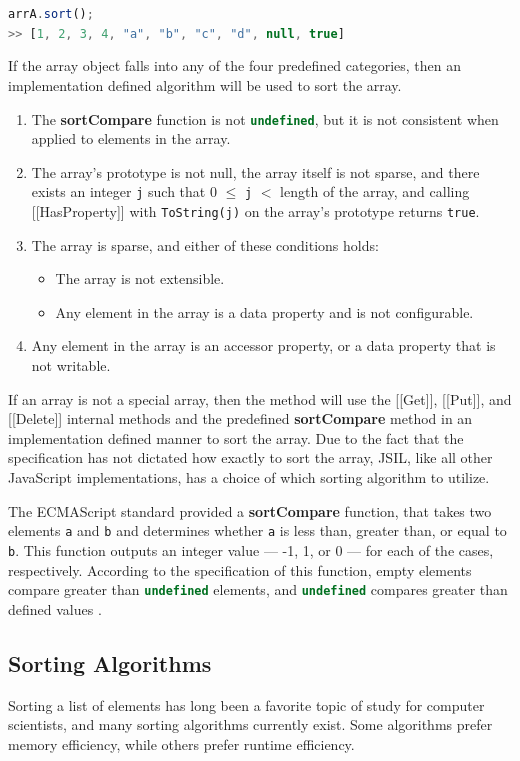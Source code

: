 \documentclass[a4paper,11pt,twoside]{report}
\def\jsinline{\lstinline[language=JavaScript, basicstyle=\small]}%\end{lstlisting}
\begin{document}
\jsinline|arrA.sort();|\\
\jsinline|>> [1, 2, 3, 4, "a", "b", "c", "d", null, true] |

If the array object falls into any of the four predefined categories, then an implementation defined algorithm will be used to sort the array. 

\begin{enumerate}
\item The \textbf{sortCompare} function is not \jsinline|undefined|, but it is not consistent when applied to elements in the array.
\item The array's prototype is not null, the array itself is not sparse, and there exists an integer \texttt{j} such that 0 $\leq$ \texttt{j} $<$ length of the array, and calling [[HasProperty]] with \texttt{ToString(j)} on the array's prototype returns \texttt{true}.
\item The array is sparse, and either of these conditions holds:
\begin{itemize}
\item The array is not extensible.
\item Any element in the array is a data property and is not configurable.
\end{itemize}
\item Any element in the array is an accessor property, or a data property that is not writable.
\end{enumerate}

If an array is not a special array, then the method will use the [[Get]], [[Put]], and [[Delete]] internal methods and the predefined \textbf{sortCompare} method in an implementation defined manner to sort the array. Due to the fact that the specification has not dictated how exactly to sort the array, JSIL, like all other JavaScript implementations, has a choice of which sorting algorithm to utilize.

The ECMAScript standard provided a \textbf{sortCompare} function, that takes two elements \jsinline|a| and \jsinline|b| and determines whether \jsinline|a| is less than, greater than, or equal to \jsinline|b|. This function outputs an integer value --- -1, 1, or 0 --- for each of the cases, respectively. According to the specification of this function, empty elements compare greater than \jsinline|undefined| elements, and \jsinline|undefined| compares greater than defined values \cite{EcmaScript}.

\subsection{Sorting Algorithms}
Sorting a list of elements has long been a favorite topic of study for computer scientists, and many sorting algorithms currently exist. Some algorithms prefer memory efficiency, while others prefer runtime efficiency. 
\end{document}
